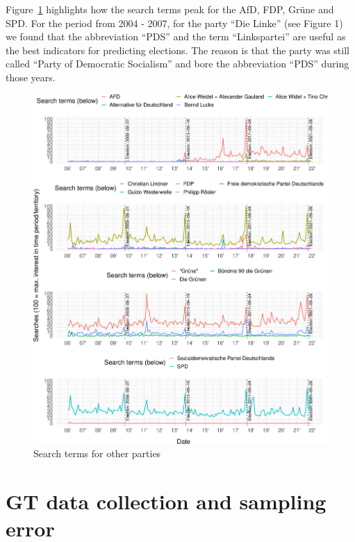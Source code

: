 \documentclass[
  letterpaper,
  DIV=11,
  numbers=noendperiod]{scrartcl}
\begin{document}
Figure~\ref{fig-A2} highlights how the search terms peak for the AfD,
FDP, Grüne and SPD. For the period from 2004 - 2007, for the party ``Die
Linke'' (see Figure 1) we found that the abbreviation ``PDS'' and the
term ``Linkspartei'' are useful as the best indicators for predicting
elections. The reason is that the party was still called ``Party of
Democratic Socialism'' and bore the abbreviation ``PDS'' during those
years.

\begin{figure}[H]

\caption{\label{fig-A2}Search terms for other parties}

{\centering \includegraphics{figures/fig-A2-1.pdf}

}

\end{figure}

\hypertarget{sec-gtsampling}{%
\section{GT data collection and sampling error}\label{sec-gtsampling}}
\end{document}
